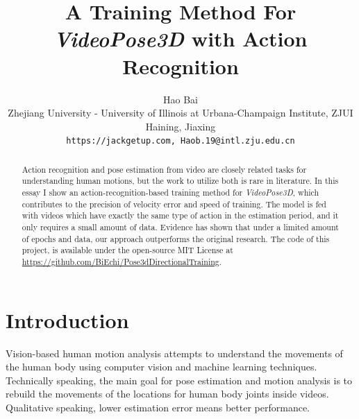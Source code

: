 \documentclass[10pt,twocolumn,letterpaper]{article}
\begin{document}
\title{A Training Method For \textit{VideoPose3D} with Action Recognition}

\author{Hao Bai\\
Zhejiang University - University of Illinois at Urbana-Champaign Institute, ZJUI\\
Haining, Jiaxing\\
{\tt\small https://jackgetup.com, Haob.19@intl.zju.edu.cn}
}

\maketitle

\begin{abstract}
	Action recognition and pose estimation from video are closely related tasks for understanding
	human motions, but the work to utilize both is rare in literature. In this essay I show an 
	action-recognition-based training method for \textit{VideoPose3D}, which contributes to the 
	precision of velocity error and speed of training. The model is fed with videos which have exactly 
	the same type of action in the estimation period, and it only requires a small amount of data. 
	Evidence has shown that under a limited amount of epochs and data, our approach outperforms 
	the original research. The code of this project, is available under the open-source MIT License at
	\url{https://github.com/BiEchi/Pose3dDirectionalTraining}. 
   

\end{abstract}

\section{Introduction}

Vision-based human motion analysis attempts to understand the movements of the human body 
using computer vision and machine learning techniques. Technically speaking, the main goal
for pose estimation and motion analysis is to rebuild the movements of the locations for 
human body joints inside videos. Qualitative speaking, lower estimation error means better 
performance.
\end{document}

